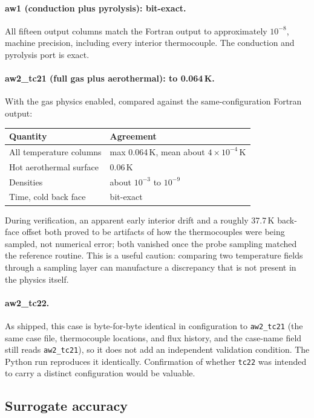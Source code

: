 \documentclass[11pt]{article}
\begin{document}
\paragraph{aw1 (conduction plus pyrolysis): bit-exact.} All fifteen output columns
match the Fortran output to approximately $10^{-8}$, machine precision, including
every interior thermocouple. The conduction and pyrolysis port is exact.

\paragraph{aw2\_tc21 (full gas plus aerothermal): to 0.064\,K.} With the gas
physics enabled, compared against the same-configuration Fortran output:

\begin{center}
\begin{tabular}{ll}
\toprule
Quantity & Agreement \\
\midrule
All temperature columns & max 0.064\,K, mean about $4\times10^{-4}$\,K \\
Hot aerothermal surface & 0.06\,K \\
Densities & about $10^{-3}$ to $10^{-9}$ \\
Time, cold back face & bit-exact \\
\bottomrule
\end{tabular}
\end{center}

During verification, an apparent early interior drift and a roughly 37.7\,K
back-face offset both proved to be artifacts of how the thermocouples were being
sampled, not numerical error; both vanished once the probe sampling matched the
reference routine. This is a useful caution: comparing two temperature fields
through a sampling layer can manufacture a discrepancy that is not present in the
physics itself.

\paragraph{aw2\_tc22.} As shipped, this case is byte-for-byte identical in
configuration to \texttt{aw2\_tc21} (the same case file, thermocouple locations,
and flux history, and the case-name field still reads \texttt{aw2\_tc21}), so it
does not add an independent validation condition. The Python run reproduces it
identically. Confirmation of whether \texttt{tc22} was intended to carry a distinct
configuration would be valuable.

\subsection{Surrogate accuracy}
\end{document}
